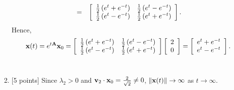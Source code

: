 \begin{solution}
\begin{enumerate}
\begin{eqnarray*}
\\
&=& \left[\begin{array}{cc}{1\over2}\left(e^t+e^{-t}\right) & {1\over2}\left(e^t - e^{-t}\right) \\ {1\over2}\left(e^t-e^{-t}\right) & {1\over2}\left(e^{t}+e^{-t}\right)\end{array}\right].
\end{eqnarray*}
Hence,
\[
{\bf x}(t) = e^{t{\bf A}} {\bf x}_0 = \left[\begin{array}{cc}{1\over2}\left(e^t+e^{-t}\right) & {1\over2}\left(e^t - e^{-t}\right) \\ {1\over2}\left(e^t-e^{-t}\right) & {1\over2}\left(e^{t}+e^{-t}\right)\end{array}\right]\left[\begin{array}{c}2 \\ 0\end{array}\right] = \left[\begin{array}{c}e^t+e^{-t} \\ e^t-e^{-t}\end{array}\right].
\]
\\
\item {[5 points]} Since $\lambda_2>0$ and ${\bf v}_2\cdot{\bf x}_0={2\over\sqrt{2}}\ne0$, $\|{\bf x}(t)\|\rightarrow\infty$ as $t\rightarrow\infty$.
\end{enumerate}
\end{solution}
